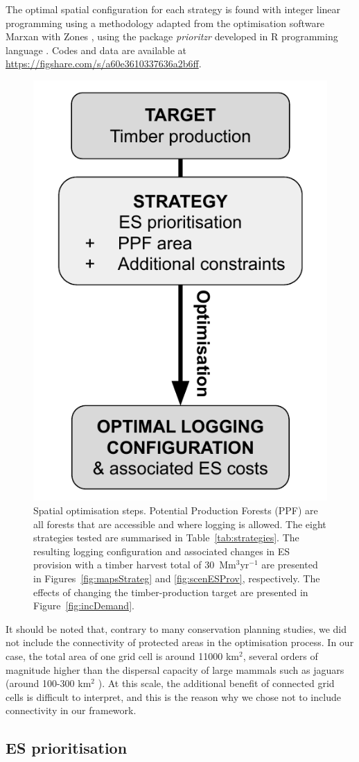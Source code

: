 \documentclass[12pt]{article}
\begin{document}
The optimal spatial configuration for each strategy is found with integer linear programming using a methodology adapted from the optimisation software Marxan with Zones \cite{Watts2009,Beyer2016}, using the package \textit{prioritzr} \cite{Hanson2018} developed in R programming language \cite{RCoreTeam2017}. Codes and data are available at \url{https://figshare.com/s/a60e3610337636a2b6ff}. 

\begin{figure}
    \centering
    \includegraphics[width = 0.4\linewidth]{graphs/diagramSpatOptim}
    \caption{Spatial optimisation steps. Potential Production Forests (PPF) are all forests that are accessible and where logging is allowed. The eight strategies tested are summarised in Table~\ref{tab:strategies}. The resulting logging configuration and associated changes in ES provision with a timber harvest total of 30~Mm$^3$yr$^{-1}$ are presented in Figures~\ref{fig:mapsStrateg} and \ref{fig:scenESProv}, respectively. The effects of changing the timber-production target are presented in Figure~\ref{fig:incDemand}.}
    \label{fig:basicDiagram}
\end{figure}

It should be noted that, contrary to many conservation planning studies, we did not include the connectivity of protected areas in the optimisation process. In our case, the total area of one grid cell is around 11000 km$^2$, several orders of magnitude higher than the dispersal capacity of large mammals such as jaguars (around 100-300 km$^2$ \cite{Bernal-Escobar2014}). At this scale, the additional benefit of connected grid cells is difficult to interpret, and this is the reason why we chose not to include connectivity in our framework.

\subsection*{ES prioritisation}
\end{document}
